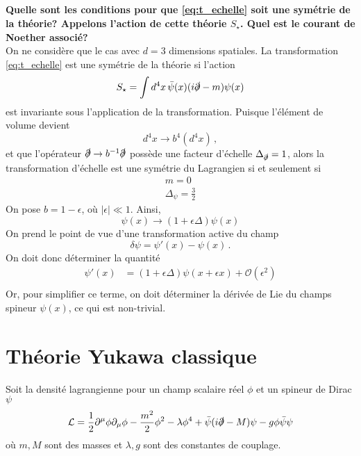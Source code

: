 \documentclass{article}
\numberwithin{equation}{section}
\theoremstyle{solution}
\begin{document}
\subsection{}
\textbf{Quelle sont les conditions pour que \eqref{eq:t_echelle} soit une symétrie de la théorie? Appelons l’action
de cette théorie $S_{\star}$. Quel est le courant de Noether associé?} \\
On ne considère que le cas avec $d = 3$ dimensions spatiales.
La transformation \eqref{eq:t_echelle} est une symétrie de la théorie si l'action 
\begin{equation}\label{eq:action}
        S_\star = \int d^{4}x\, \bar{\psi}(x)(i \slashed{\partial} - m)\psi(x)
\end{equation} 
est invariante sous l'application de la transformation. Puisque l'élément de volume devient
\begin{equation}
        d^{4}x \rightarrow b^{4}(d^{4}x)\, ,
\end{equation} 
et que l'opérateur $\slashed{\partial} \rightarrow b^{-1} \slashed{\partial}$ possède une facteur d'échelle $\Delta_{\slashed{\partial}} = 1$, alors 
la transformation d'échelle est une symétrie du Lagrangien si et seulement si
\begin{equation}
        \boxed{
        \begin{split}
              m = 0 \\
              \Delta_\psi = \frac{3}{2}
        \end{split}
}
\end{equation} 
On pose $b = 1 - \epsilon$, où $|\epsilon| \ll 1$. Ainsi, 
\begin{equation}
        \psi(x) \rightarrow  (1 + \epsilon\Delta ) \psi(x)
\end{equation} 
On prend le point de vue d'une transformation active du champ
\begin{equation}
        \delta \psi = \psi'(x) - \psi(x) \, .
\end{equation} 
On doit donc déterminer la quantité
\begin{align*}
        \psi'(x) &=  (1 + \epsilon\Delta ) \psi(x + \epsilon x) + \mathcal{O}(\epsilon^{2}) \\
\end{align*}
Or, pour simplifier ce terme, on doit déterminer la dérivée de Lie du champs spineur $\psi(x)$, ce qui est non-trivial.
\section{Théorie Yukawa classique}
Soit la densité lagrangienne pour un champ scalaire réel $\phi$ et un spineur de Dirac $\psi$
\begin{equation}
        \mathcal{L} = \frac{1}{2}\partial^{\mu}\phi \partial_\mu \phi - \frac{m^{2}}{2}\phi^{2} - \lambda \phi^{4} + \bar{\psi}(i \slashed{\partial} - M) \psi - g \phi\bar{\psi}\psi
\end{equation} 
où $m, M$ sont des masses et $\lambda,g$ sont des constantes de couplage.
\end{document}
